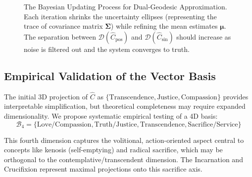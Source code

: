 \documentclass[11pt,a4paper]{article}
\theoremstyle{definition}
\theoremstyle{remark}
\begin{document}
\begin{small}
\begin{figure}[h!]
    \caption{The Bayesian Updating Process for Dual-Geodesic Approximation. Each iteration shrinks the uncertainty ellipses (representing the trace of covariance matrix \(\boldsymbol{\Sigma}\)) while refining the mean estimates \(\boldsymbol{\mu}\). The separation between \(\mathcal{D}(\hat{C}_{\text{pos}})\) and \(\mathcal{D}(\hat{C}_{\text{sin}})\) should increase as noise is filtered out and the system converges to truth.}
    \label{fig:bayesian_update}
\end{figure}

\subsection{Empirical Validation of the Vector Basis}

The initial 3D projection of \(\hat{C}\) as \(\{\text{Transcendence}, \text{Justice}, \text{Compassion}\}\) provides interpretable simplification, but theoretical completeness may require expanded dimensionality. We propose systematic empirical testing of a 4D basis:
\begin{equation}
\mathcal{B}_4 = \{\text{Love/Compassion}, \text{Truth/Justice}, \text{Transcendence}, \text{Sacrifice/Service}\}
\end{equation}

This fourth dimension captures the volitional, action-oriented aspect central to concepts like kenosis (self-emptying) and radical sacrifice, which may be orthogonal to the contemplative/transcendent dimension. The Incarnation and Crucifixion represent maximal projections onto this sacrifice axis.


\end{small}
\end{document}
